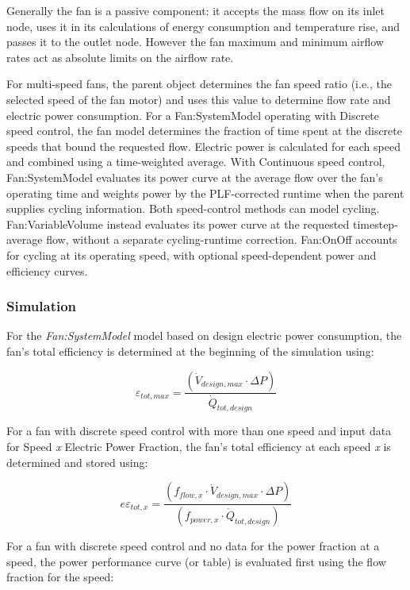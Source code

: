 Generally the fan is a passive component: it accepts the mass flow on its inlet node, uses it in its calculations of energy consumption and temperature rise, and passes it to the outlet node. However the fan maximum and minimum airflow rates act as absolute limits on the airflow rate.

For multi-speed fans, the parent object determines the fan speed ratio (i.e., the selected speed of the fan motor) and uses this value to determine flow rate and electric power consumption. For a Fan:SystemModel operating with Discrete speed control, the fan model determines the fraction of time spent at the discrete speeds that bound the requested flow. Electric power is calculated for each speed and combined using a time-weighted average. With Continuous speed control, Fan:SystemModel evaluates its power curve at the average flow over the fan's operating time and weights power by the PLF-corrected runtime when the parent supplies cycling information. Both speed-control methods can model cycling. Fan:VariableVolume instead evaluates its power curve at the requested timestep-average flow, without a separate cycling-runtime correction. Fan:OnOff accounts for cycling at its operating speed, with optional speed-dependent power and efficiency curves.

\subsubsection{Simulation}\label{simulation}

For the \emph{Fan:SystemModel} model based on design electric power consumption, the fan's total efficiency is determined at the beginning of the simulation using:

\begin{equation}
{\varepsilon_{tot,max}} = \frac{({\dot V_{design,max} \cdot \Delta P  } )}{{ \dot Q_{tot, design}}}
\end{equation}

For a fan with discrete speed control with more than one speed and input data for Speed \emph{x} Electric Power Fraction, the fan's total efficiency at each speed \emph{x} is determined and stored using:

\begin{equation}
{e\varepsilon_{tot,x}} = \frac {({f_{flow,x}} \cdot {\dot V_{design,max} \cdot \Delta P  } )}{( {f_{power,x}} \cdot { \dot Q_{tot, design}})}
\end{equation}

For a fan with discrete speed control and no data for the power fraction at a speed, the power performance curve (or table) is evaluated first using the flow fraction for the speed:


